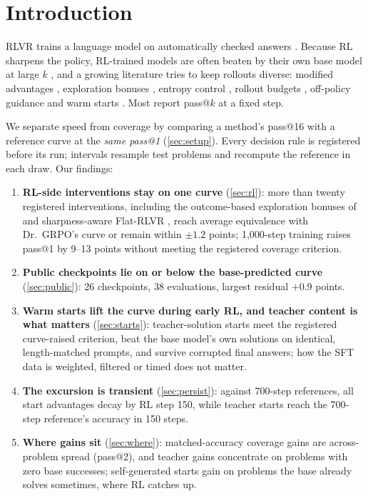 \documentclass{article}
\theoremstyle{plain}
\begin{document}
\section{Introduction}
RLVR trains a language model on automatically checked answers \citep{shao2024deepseekmath,guo2025r1}. Because RL
sharpens the policy, RL-trained models are often beaten by their own base model at large $k$ \citep{yue2025limit},
and a growing literature tries to keep rollouts diverse: modified advantages \citep{zhu2025nsr,walder2025pkpo,
chen2025passktraining}, exploration bonuses \citep{song2025outcome}, entropy control \citep{cui2025entropy}, rollout
budgets \citep{hu2025brorl,yang2025depth,knapsack2025,yu2026datpo}, off-policy guidance \citep{yan2025guidance,
ma2025relift,li2025questa,zhang2025bread} and warm starts \citep{dong2026opd,malladi2026tailsft}. Most report pass@$k$
at a fixed step.

We separate speed from coverage by comparing a method's pass@16 with a reference curve at the \emph{same pass@1}
(\cref{sec:setup}). Every decision rule is registered before its run; intervals resample test problems and recompute
the reference in each draw. Our findings:
\begin{enumerate}[leftmargin=*,itemsep=1pt,topsep=2pt]
\item \textbf{RL-side interventions stay on one curve} (\cref{sec:rl}): more than twenty registered interventions,
including the outcome-based exploration bonuses of \citet{song2025outcome} and sharpness-aware Flat-RLVR
\citep{kim2026flat}, reach average equivalence with Dr.\ GRPO's curve or remain within $\pm1.2$ points; 1,000-step
training raises pass@1 by 9--13 points without meeting the registered coverage criterion.
\item \textbf{Public checkpoints lie on or below the base-predicted curve} (\cref{sec:public}): 26 checkpoints, 38
evaluations, largest residual $+0.9$ points.
\item \textbf{Warm starts lift the curve during early RL, and teacher content is what matters}
(\cref{sec:starts}): teacher-solution starts meet the registered curve-raised criterion, beat the base model's own
solutions on identical, length-matched prompts, and survive corrupted final answers; how the SFT data is weighted,
filtered or timed does not matter.
\item \textbf{The excursion is transient} (\cref{sec:persist}): against 700-step references, all start advantages
decay by RL step 150, while teacher starts reach the 700-step reference's accuracy in 150 steps.
\item \textbf{Where gains sit} (\cref{sec:where}): matched-accuracy coverage gains are across-problem spread (pass@2),
and teacher gains concentrate on problems with zero base successes; self-generated starts gain on problems the base
already solves sometimes, where RL catches up.
\end{enumerate}
\end{document}
